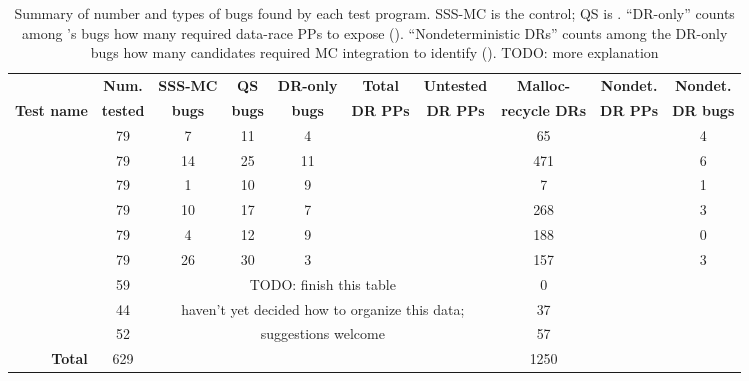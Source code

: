 \begin{table}[t]
	\begin{center}
		\small
	\begin{tabular}{r|c||c|c|c||c|c|c|c|c}
		& {\bf Num.} & {\bf SSS-MC} & {\bf QS} & {\bf DR-only} & {\bf Total} & {\bf Untested} & {\bf Malloc-} & {\bf Nondet.} & {\bf Nondet.} \\
		{\bf Test name} & {\bf tested} & {\bf bugs} & {\bf bugs} & {\bf bugs} & {\bf DR PPs} & {\bf DR PPs} & {\bf recycle DRs} & {\bf DR PPs} & {\bf DR bugs} \\
		\hline
		{\bct		} & 79	& 7	& 11	& 4	&	&	& 65	&	& 4	\\
		{\tej		} & 79	& 14 	& 25	& 11	&	&	& 471	&	& 6	\\
		{\mxtest	} & 79	& 1	& 10	& 9	&	&	& 7	&	& 1	\\
		{\paradise	} & 79	& 10	& 17	& 7	&	&	& 268	&	& 3	\\
		{\paraguay	} & 79	& 4	& 12	& 9	&	&	& 188	&	& 0	\\
		{\rwldgr	} & 79	& 26	& 30	& 3	&	&	& 157	&	& 3	\\
		\hline
		{\prisema	} & 59	& \multicolumn{5}{c}{TODO: finish this table} & 0	&	&	\\
		{\alarmsimul	} & 44	& \multicolumn{5}{c}{haven't yet decided how to organize this data;} & 37	&	&	\\
		{\waitsimple	} & 52	& \multicolumn{5}{c}{suggestions welcome} & 57	&	&	\\
		\hline
		{\bf Total}	& 629	&	&	&	&	&	& 1250	&	&
	\end{tabular}
	\end{center}
	\caption{Summary of number and types of bugs found by each test program.
		SSS-MC is the control; QS is \quicksand.
		``DR-only'' counts among \quicksand's bugs how many required data-race PPs to expose (\sect{\ref{sec:eval-sssmc}}).
	``Nondeterministic DRs'' counts among the DR-only bugs how many candidates required MC integration to identify (\sect{\ref{sec:eval-falseneg}}).
		TODO: more explanation}
	\label{tab:drbugs}
\end{table}

